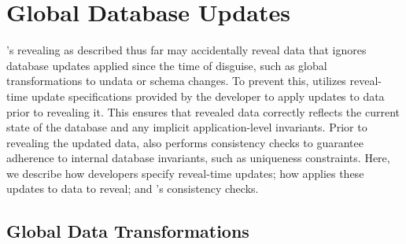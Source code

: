 \section{Global Database Updates}
\label{s:design:database-updates}
\sys's revealing as described thus far may accidentally reveal data that ignores
database updates applied since the time of disguise, such as global
transformations to un\xxed data or schema changes.
%
To prevent this, \sys utilizes reveal-time update specifications provided by the
developer to apply updates to \xxed data prior to revealing it. This ensures
that revealed data correctly reflects the current state of the database and any
implicit application-level invariants.
%
Prior to revealing the updated data, \sys also performs consistency checks
to guarantee adherence to internal database invariants, such as uniqueness
constraints.
%
Here, we describe how developers specify reveal-time updates; how \sys applies
these updates to data to reveal; and \sys's consistency checks.

%
\subsection{Global Data Transformations}
\label{s:design:updates}

